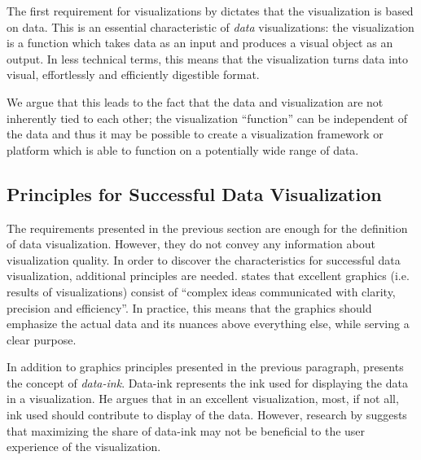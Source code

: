 The first requirement for visualizations by \citet{kosara_visualization_2007} dictates that the visualization is based on data. This is an essential characteristic of \emph{data} visualizations: the visualization is a function which takes data as an input and produces a visual object as an output. In less technical terms, this means that the visualization turns data into visual, effortlessly and efficiently digestible format.

We argue that this leads to the fact that the data and visualization are not inherently tied to each other; the visualization ``function'' can be independent of the data and thus it may be possible to create a visualization framework or platform which is able to function on a potentially wide range of data.


\subsection{Principles for Successful Data Visualization}

The requirements presented in the previous section are enough for the definition of data visualization. However, they do not convey any information about visualization quality. In order to discover the characteristics for successful data visualization, additional principles are needed. \citet[p.~13]{tufte_visual_1986} states that excellent graphics (i.e. results of visualizations) consist of ``complex ideas communicated with clarity, precision and efficiency''. In practice, this means that the graphics should emphasize the actual data and its nuances above everything else, while serving a clear purpose.

In addition to graphics principles presented in the previous paragraph, \citet[p.~93]{tufte_visual_1986} presents the concept of \emph{data-ink}. Data-ink represents the ink used for displaying the data in a visualization. He argues that in an excellent visualization, most, if not all, ink used should contribute to display of the data. However, research by \citet{inbar_minimalism_2007} suggests that maximizing the share of data-ink may not be beneficial to the user experience of the visualization. 

